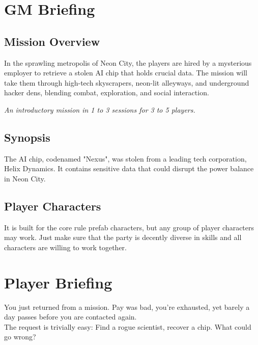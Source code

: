 \chapter{GM Briefing}
\section{Mission Overview}
In the sprawling metropolis of Neon City,
the players are hired by a mysterious employer to retrieve a stolen AI chip that holds crucial data.
The mission will take them through high-tech skyscrapers,
neon-lit alleyways, and underground hacker dens,
blending combat, exploration, and social interaction.
\par
\emph{An introductory mission in 1 to 3 sessions for 3 to 5 players.}
\section{Synopsis}
The AI chip, codenamed "Nexus", was stolen from a leading tech corporation, Helix Dynamics.
It contains sensitive data that could disrupt the power balance in Neon City.
\section{Player Characters}
It is built for the core rule prefab characters,
but any group of player characters may work.
Just make sure that the party is decently diverse in skills
and all characters are willing to work together.

\chapter{Player Briefing}
You just returned from a mission.
Pay was bad, you're exhausted,
yet barely a day passes before you are contacted again.
\\%
The request is trivially easy:
Find a rogue scientist, recover a chip.
What could go wrong?

